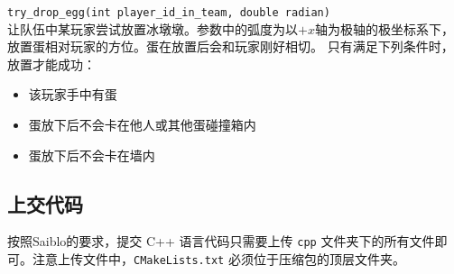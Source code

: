 \documentclass{article}
\begin{document}
\begin{description}
\lstinline{try_drop_egg(int player_id_in_team, double radian)}\\[-2pt]
让队伍中某玩家尝试放置冰墩墩。参数中的弧度为以$+x$轴为极轴的极坐标系下，放置蛋相对玩家的方位。蛋在放置后会和玩家刚好相切。
只有满足下列条件时，放置才能成功：

\begin{itemize}\setlength\itemsep{0em}
\item 该玩家手中有蛋
\item 蛋放下后不会卡在他人或其他蛋碰撞箱内
\item 蛋放下后不会卡在墙内
\end{itemize}

\end{description}

\subsection{上交代码}

按照Saiblo的要求，提交 C++ 语言代码只需要上传 \texttt{cpp} 文件夹下的所有文件即可。注意上传文件中，\texttt{CMakeLists.txt} 必须位于压缩包的顶层文件夹。
\end{document}
